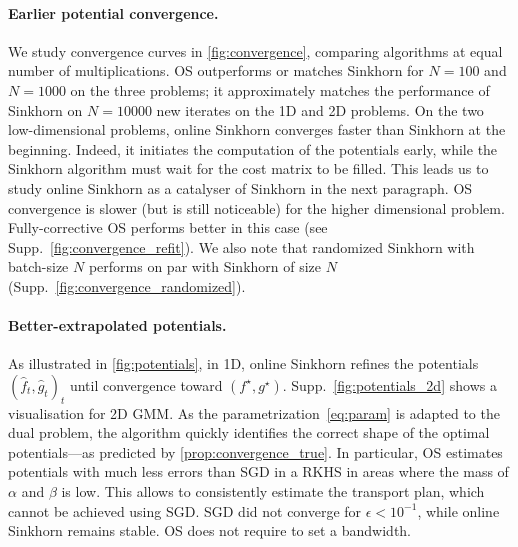 \paragraph{Earlier potential convergence.}
We study convergence curves in \autoref{fig:convergence}, comparing algorithms
at equal number of multiplications. OS outperforms or matches Sinkhorn for $N=100$
and $N=1000$ on the three problems; it approximately matches the performance of
Sinkhorn on $N=10000$ new iterates on the 1D and 2D problems. On the two
low-dimensional problems, online Sinkhorn converges faster than Sinkhorn at the
beginning. Indeed, it initiates the computation of the potentials early, while the Sinkhorn
algorithm must wait for the cost matrix to be filled. This leads us
to study online Sinkhorn as a catalyser of Sinkhorn in the next paragraph. OS
convergence is slower (but is still noticeable) for the higher dimensional problem.
Fully-corrective OS performs better in this case (see Supp.~\autoref{fig:convergence_refit}). We also note that randomized Sinkhorn with batch-size $N$ performs on par with Sinkhorn of size $N$ (Supp.~\autoref{fig:convergence_randomized}).

\paragraph{Better-extrapolated potentials.} As illustrated in
\autoref{fig:potentials}, in 1D, online Sinkhorn refines the potentials $(\hat f_t, \hat g_t)_t$
until convergence toward $(f^\star, g^\star)$. Supp.~\autoref{fig:potentials_2d} shows a visualisation for 2D GMM. As the parametrization~\eqref{eq:param} is
adapted to the dual problem, the algorithm quickly identifies the correct shape of
the optimal potentials---as predicted by \autoref{prop:convergence_true}. In
particular, OS estimates potentials with much less errors than SGD in a RKHS in
areas where the mass of $\alpha$ and $\beta$ is low. This allows to consistently estimate the transport plan, which cannot be achieved using SGD. SGD did not converge for $\epsilon < 10^{-1}$, while online Sinkhorn remains stable. OS does not require to set a bandwidth.

\setlength{\tabcolsep}{2pt}

